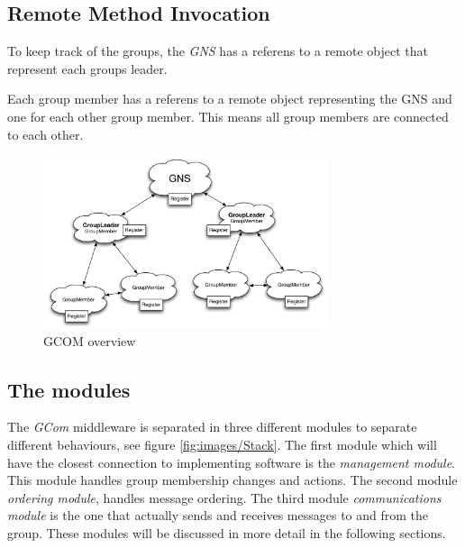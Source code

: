 \documentclass[titlepage, twocolumn, a4paper, 10pt]{article}
\begin{document}
\subsection{Remote Method Invocation}\label{sec:rmi}
To keep track of the groups, the \textit{GNS} has a referens to a
remote object that represent each groups leader.

Each group member has a referens to a remote object representing the
GNS and one for each other group member. This means all group members
are connected to each other.

\begin{figure}[!thb]
  \centering
  \includegraphics[width=3.3in]{images/Overview.pdf}
  \caption{GCOM overview}
  \label{fig:images/overview}
\end{figure}


\subsection{The modules}\label{sec:modules}

The \textit{GCom} middleware is separated in three different modules
to separate different behaviours, see figure \vref{fig:images/Stack}.
The first module which will have the closest connection to
implementing software is the \textit{management module}. This module
handles group membership changes and actions. The second module
\textit{ordering module}, handles message ordering. The third module
\textit{communications module} is the one that actually sends and
receives messages to and from the group. These modules will be
discussed in more detail in the following sections.

\end{document}
